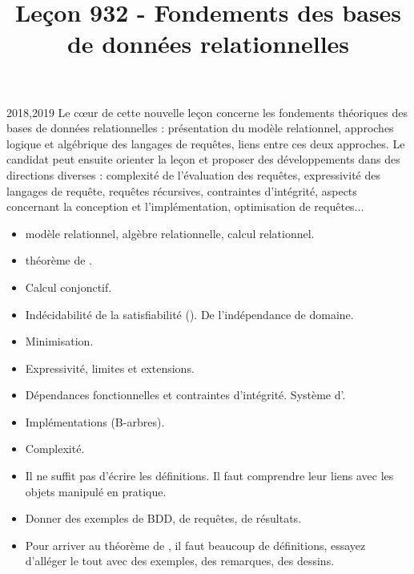 \documentclass{agregfiche}
\title{Leçon 932 - Fondements des bases de données relationnelles}
\begin{document}
\maketitle

\secrapports
\begin{rapport}{2018,2019}
    Le cœur de cette nouvelle leçon concerne les fondements
    théoriques des bases de données relationnelles :
    présentation du modèle relationnel, approches logique et
    algébrique des langages de requêtes, liens entre
    ces deux approches.
    Le candidat peut ensuite orienter la leçon et proposer des
    développements dans des directions diverses : complexité de
    l’évaluation des requêtes, expressivité
    des langages de requête, requêtes récursives, contraintes
    d’intégrité, aspects concernant la conception
    et l’implémentation, optimisation de
    requêtes...
\end{rapport}

\secindispensables

\begin{itemize}
    \item  modèle relationnel, algèbre relationnelle, calcul
      relationnel.
    \item théorème de .
\end{itemize}

\secasavoir

\begin{itemize}
    \item Calcul conjonctif.
    \item Indécidabilité de la satisfiabilité ().
      De l'indépendance de domaine.
\end{itemize}

\secidees

\begin{itemize}
    \item Minimisation.
    \item Expressivité, limites et extensions.
    \item Dépendances fonctionnelles et contraintes d'intégrité.
	Système d'.
    \item Implémentations (B-arbres).
    \item Complexité.
\end{itemize}

\secpieges

\begin{itemize}
    \item Il ne suffit pas d'écrire les définitions. Il faut
	comprendre leur liens avec les objets manipulé en pratique.
    \item Donner des exemples de BDD, de requêtes, de résultats.
    \item Pour arriver au théorème de , il faut beaucoup de
    définitions, essayez d'alléger le tout avec des exemples, des
    remarques, des dessins.
\end{itemize}
\end{document}
